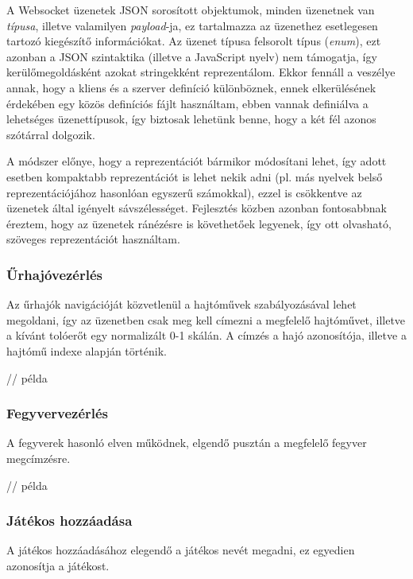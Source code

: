 \begin{itemize}
A Websocket üzenetek JSON sorosított objektumok, minden üzenetnek van
\emph{típusa}, illetve valamilyen \emph{payload}-ja, ez tartalmazza az üzenethez
esetlegesen tartozó kiegészítő információkat. Az üzenet típusa felsorolt típus (\emph{enum}), ezt azonban a JSON szintaktika (illetve a JavaScript nyelv) nem támogatja, így kerülőmegoldásként azokat stringekként reprezentálom. Ekkor fennáll a veszélye annak, hogy a kliens és a szerver definíció különböznek, ennek elkerülésének érdekében egy közös definíciós fájlt használtam, ebben vannak definiálva a lehetséges üzenettípusok, így biztosak lehetünk benne, hogy a két fél azonos szótárral dolgozik.

A módszer előnye, hogy a reprezentációt bármikor módosítani lehet, így adott esetben kompaktabb reprezentációt is lehet nekik adni (pl. más nyelvek belső reprezentációjához hasonlóan egyszerű számokkal), ezzel is csökkentve az üzenetek által igényelt sávszélességet. Fejlesztés közben azonban fontosabbnak éreztem, hogy az üzenetek ránézésre is követhetőek legyenek, így ott olvasható, szöveges reprezentációt használtam.

\subsubsection{Űrhajóvezérlés}

Az űrhajók navigációját közvetlenül a hajtóművek szabályozásával lehet megoldani, így az üzenetben csak meg kell címezni a megfelelő hajtóművet, illetve a kívánt tolóerőt egy normalizált 0-1 skálán. A címzés a hajó azonosítója, illetve a hajtómű indexe alapján történik.

\begin{js}
  // példa
\end{js}

\subsubsection{Fegyvervezérlés}

A fegyverek hasonló elven működnek, elgendő pusztán a megfelelő fegyver megcímzésre.

\begin{js}
  // példa
\end{js}

\subsubsection{Játékos hozzáadása}

A játékos hozzáadásához elegendő a játékos nevét megadni, ez egyedien azonosítja a játékost.


\end{itemize}

